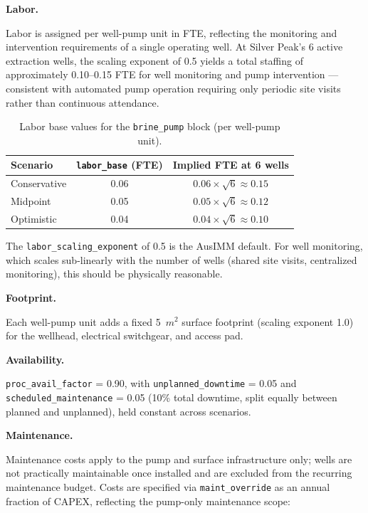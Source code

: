 \medskip
\noindent\textbf{Labor.}\quad

Labor is assigned per well-pump unit in FTE, reflecting the monitoring and intervention requirements of a single operating well. At Silver Peak's 6 active extraction wells, the scaling exponent of 0.5 yields a total staffing of approximately 0.10--0.15 FTE for well monitoring and pump intervention --- consistent with automated pump operation requiring only periodic site visits rather than continuous attendance.

\begin{table}[h!]
\caption{Labor base values for the \texttt{brine\_pump} block (per well-pump unit).}
\centering
\begin{tabular}{lcc}
\toprule
\textbf{Scenario} & \texttt{labor\_base} (FTE) & \textbf{Implied FTE at 6 wells} \\
\midrule
Conservative & 0.06 & $0.06 \times \sqrt{6} \approx 0.15$ \\
Midpoint     & 0.05 & $0.05 \times \sqrt{6} \approx 0.12$ \\
Optimistic   & 0.04 & $0.04 \times \sqrt{6} \approx 0.10$ \\
\bottomrule
\end{tabular}
\end{table}

\noindent The \texttt{labor\_scaling\_exponent} of 0.5 is the AusIMM default. For well monitoring, which scales sub-linearly with the number of wells (shared site visits, centralized monitoring), this should be physically reasonable.

\medskip
\noindent\textbf{Footprint.}\quad

Each well-pump unit adds a fixed 5~$\si{m^2}$ surface footprint (scaling exponent 1.0) for the wellhead, electrical switchgear, and access pad.

\medskip
\noindent\textbf{Availability.}\quad

\texttt{proc\_avail\_factor} = 0.90, with \texttt{unplanned\_downtime} = 0.05 and \texttt{scheduled\_maintenance} = 0.05 (10\% total downtime, split equally between planned and unplanned), held constant across scenarios.

\medskip
\noindent\textbf{Maintenance.}\quad

Maintenance costs apply to the pump and surface infrastructure only; wells are not practically maintainable once installed and are excluded from the recurring maintenance budget. Costs are specified via \texttt{maint\_override} as an annual fraction of CAPEX, reflecting the pump-only maintenance scope:

